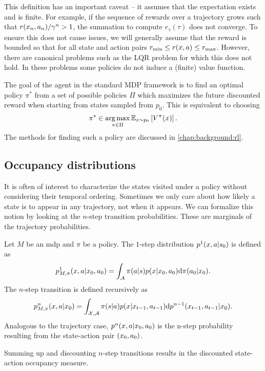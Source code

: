 This definition has an important caveat -- it assumes that the expectation exists and is finite.
For example, if the sequence of rewards over a trajectory grows such that $r(x_n,a_n)/\gamma^n > 1$, the summation to compute $r_\gamma(\tau)$ does not converge.
To ensure this does not cause issues, we will generally assume that the reward is bounded so that for all state and action pairs $r_{\min} \leq r(x,a) \leq r_{\max}$.
However, there are canonical problems such as the LQR problem for which this does not hold.
In these problems some policies do not induce a (finite) value function.

The goal of the agent in the standard MDP framework is to find an optimal policy $\pi^*$ from a set of possible policies $\Pi$ which maximizes the future discounted reward when starting from states sampled from $p_0$.
This is equivalent to choosing $$\pi^* \in \operatorname*{arg\,max}_{\pi \in \Pi} \mathbb{E}_{x \sim p_0}\left[V^\pi(x)\right].$$
The methods for finding such a policy are discussed in \autoref{chap:background:rl}.

\subsection{Occupancy distributions}

It is often of interest to characterize the states visited under a policy without considering their temporal ordering.
Sometimes we only care about how likely a state is to appear in any trajectory, not when it appears.
We can formalize this notion by looking at the $n$-step transition probabilities.
These are marginals of the trajectory probabilities.

\begin{definition}
    Let $M$ be an \ac{mdp} and $\pi$ be a policy.
    The $1$-step distribution $p^1(x,a|s_0)$ is defined as $$p^1_{M, \pi}(x,a|x_0,a_0) = \int_{\mathcal{A}} \pi(a|s) p(x|x_0,a_0) \mathrm{d} \pi(a_0|x_0).$$ 
    The $n$-step transition is defined recursively as $$p^n_{M, \pi}(x,a|x_0) = \int_{\mathcal{X},\mathcal{A}} \pi(s|a) p(x|x_{t-1},a_{t-1}) \mathrm{d} p^{n-1}(x_{t-1},a_{t-1}|x_0) .$$
    Analogous to the trajectory case, $p^n(x,a|x_0,a_0)$ is the n-step probability resulting from the state-action pair $(x_0,a_0)$.
\end{definition}

Summing up and discounting $n$-step transitions results in the discounted state-action occupancy measure.

